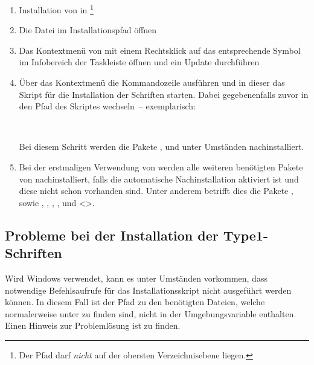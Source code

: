 \begin{enumerate}
\item Installation von  in 
  \footnote{Der Pfad darf \emph{nicht} auf der obersten Verzeichnisebene 
   liegen.
  }
\item Die Datei  im Installationspfad öffnen
\item Das Kontextmenü von  mit einem 
  Rechtsklick auf das entsprechende Symbol im Infobereich der Taskleiste öffnen 
  und ein Update durchführen
\item Über das Kontextmenü die Kommandozeile ausführen und in dieser das Skript 
  für die Installation der Schriften  starten.
  Dabei gegebenenfalls zuvor in den Pfad des Skriptes wechseln~-- exemplarisch:
  \begin{quoting}[leftmargin=1.5em,rightmargin=0pt]
  \newline
  \,
  \end{quoting}
  Bei diesem Schritt werden die Pakete ,  
  und  unter Umständen nachinstalliert.
\item Bei der erstmaligen Verwendung von \TUDScript werden alle weiteren 
  benötigten Pakete von  
  nachinstalliert, falls die automatische Nachinstallation aktiviert ist und 
  diese nicht schon vorhanden sind. Unter anderem betrifft dies die Pakete 
  ,  sowie , 
   , , 
  ,  und <>.  
\end{enumerate}


\subsection{Probleme bei der Installation der Type1-Schriften}
%
Wird Windows verwendet, kann es unter Umständen vorkommen, dass notwendige 
Befehlsaufrufe für das Installationsskript nicht ausgeführt werden können. In 
diesem Fall ist der Pfad zu den benötigten Dateien, welche normalerweise unter 
 zu finden sind, nicht in der 
Umgebungsvariable  enthalten. Einen Hinweis zur Problemlösung ist 
zu finden.

